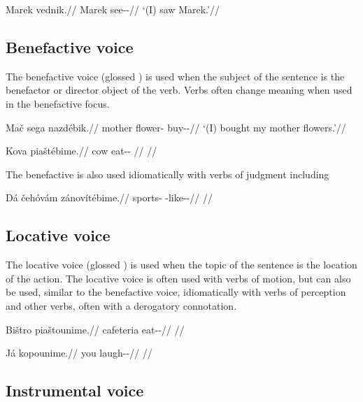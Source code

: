 \pex
\begingl
\gla Marek vednik.//
\glb Marek see-\Pv{}-\Pfv{}//
\glft `(I) saw Marek.'//
\endgl
\xe


\subsection{Benefactive voice}

The benefactive voice (glossed \Ben{}) is used when the subject of the
sentence is the benefactor or director object of the verb. Verbs often change
meaning when used in the benefactive focus.


\begin{multicols}{2}
\pex
\begingl
\gla Mač sega nazdébik.//
\glb mother flower-\Acc{} buy-\Ben{}-\Pf{}//
\glft `(I) bought my mother flowers.'//
\endgl
\xe

\pex
\begingl
\gla Kova piaštébime.//
\glb cow eat-\Ben{}-\Prog{} //
\glft {}//
\endgl
\xe

\end{multicols}

The benefactive is also used idiomatically with verbs of judgment including
 

\pex
\begingl
\gla Dá čehóvám zánovítébime.//
\glb \First\Sg{} sports-\Agt{} \Neg{}-like-\Ben{}-\Prog{}//
\glft {}//
\endgl
\xe

\subsection{Locative voice}

The locative voice (glossed \Lv{}) is used when the topic of the sentence is
the location of the action. The locative voice is often used with verbs of
motion, but can also be used, similar to the benefactive voice, idiomatically
with verbs of perception and other verbs, often with a derogatory connotation.

\pex
\begingl
\gla Bištro piaštounime.//
\glb cafeteria eat-\Loc{}-\Prog{}//
\glft {}//
\endgl
\xe

\pex
\begingl
\gla Já kopounime.//
\glb you laugh-\Lv{}-\Prog{}//
\glft {}//
\endgl
\xe

\subsection{Instrumental voice}

